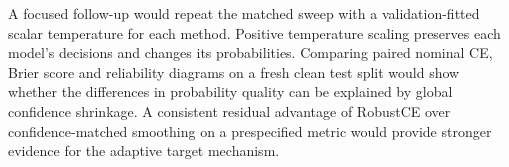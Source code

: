 \documentclass[11pt,a4paper]{article}
\begin{document}
A focused follow-up would repeat the matched sweep with a validation-fitted
scalar temperature for each method. Positive temperature scaling preserves
each model's decisions and changes its probabilities. Comparing paired
nominal CE, Brier score and reliability diagrams on a fresh clean test split
would show whether the differences in probability quality can be explained
by global confidence shrinkage. A consistent residual advantage of RobustCE
over confidence-matched smoothing on a prespecified metric would provide
stronger evidence for the adaptive target mechanism.
\end{document}
